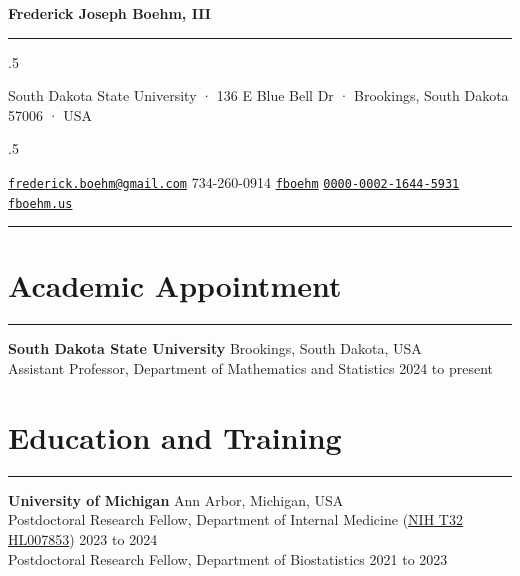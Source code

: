 \documentclass[
  10pt,
]
{article}
\begin{document}
\centerline{\huge \bf Frederick Joseph Boehm, III}

\vspace{2 mm}

\hrule

\vspace{2 mm}


\moveleft.5\hoffset\centerline{South Dakota State University · 136 E
Blue Bell Dr · Brookings, South Dakota 57006 · USA}
\moveleft.5\hoffset\centerline{ \faEnvelopeO \hspace{1 mm} \href{mailto:}{\tt frederick.boehm@gmail.com} \hspace{1 mm}  \faPhone \hspace{1 mm}  734-260-0914  \hspace{1 mm}  \faGithub \hspace{1 mm} \href{http://github.com/fboehm}{\tt fboehm} \hspace{1 mm}      \hspace{.5 mm} \href{https://orcid.org/0000-0002-1644-5931}{\tt 0000-0002-1644-5931} \hspace{1 mm}  \faGlobe \hspace{1 mm} \href{http://fboehm.us}{\tt fboehm.us}   }



\vspace{2 mm}

\hrule



\section{Academic Appointment}\label{academic-appointment}

\hrule

\textbf{South Dakota State University} \hfill Brookings, South Dakota,
USA\\
Assistant Professor, Department of Mathematics and Statistics
\hfill 2024 to present

\section{Education and Training}\label{education-and-training}

\hrule

\textbf{University of Michigan} \hfill Ann Arbor, Michigan, USA\\
Postdoctoral Research Fellow, Department of Internal Medicine
(\href{https://reporter.nih.gov/search/edYVbhxf0Uu_nQ9-JqHDJA/project-details/10576923}{NIH
T32 HL007853}) \hfill 2023 to 2024\\
Postdoctoral Research Fellow, Department of Biostatistics \hfill 2021 to
2023
\end{document}

